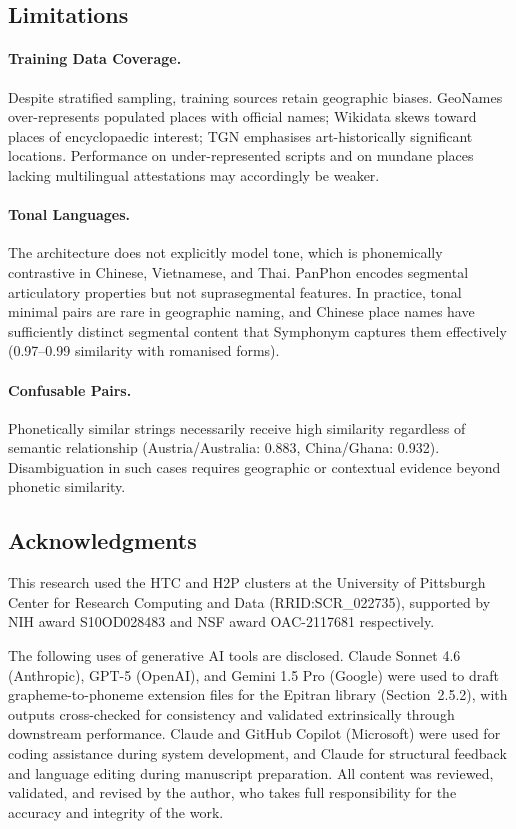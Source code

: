 \documentclass[11pt,a4paper]{article}
\begin{document}
\subsection{Limitations}
\label{subsec:limitations}

\paragraph{Training Data Coverage.} Despite stratified sampling, training sources retain geographic biases. GeoNames over-represents populated places with official names; Wikidata skews toward places of encyclopaedic interest; TGN emphasises art-historically significant locations. Performance on under-represented scripts and on mundane places lacking multilingual attestations may accordingly be weaker.

\paragraph{Tonal Languages.} The architecture does not explicitly model tone, which is phonemically contrastive in Chinese, Vietnamese, and Thai. PanPhon encodes segmental articulatory properties but not suprasegmental features. In practice, tonal minimal pairs are rare in geographic naming, and Chinese place names have sufficiently distinct segmental content that Symphonym captures them effectively (0.97--0.99 similarity with romanised forms).

\paragraph{Confusable Pairs.} Phonetically similar strings necessarily receive high similarity regardless of semantic relationship (Austria/Australia: 0.883, China/Ghana: 0.932). Disambiguation in such cases requires geographic or contextual evidence beyond phonetic similarity.

\subsection*{Acknowledgments}

This research used the HTC and H2P clusters at the University of Pittsburgh Center for Research Computing and Data (RRID:SCR\_022735), supported by NIH award S10OD028483 and NSF award OAC-2117681 respectively.

The following uses of generative AI tools are disclosed. Claude Sonnet 4.6 (Anthropic), GPT-5 (OpenAI), and Gemini 1.5 Pro (Google) were used to draft grapheme-to-phoneme extension files for the Epitran library (Section~2.5.2), with outputs cross-checked for consistency and validated extrinsically through downstream performance. Claude and GitHub Copilot (Microsoft) were used for coding assistance during system development, and Claude for structural feedback and language editing during manuscript preparation. All content was reviewed, validated, and revised by the author, who takes full responsibility for the accuracy and integrity of the work.
\end{document}
